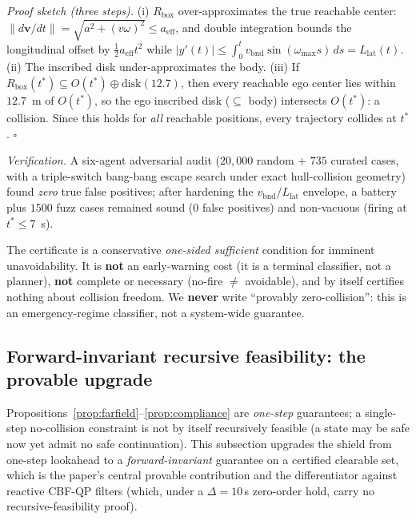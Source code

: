 \emph{Proof sketch (three steps).} (i) $R_{\mathrm{box}}$ over-approximates the true
reachable center: $\lVert d\bm{v}/dt\rVert=\sqrt{a^2+(v\omega)^2}\le a_{\mathrm{eff}}$,
and double integration bounds the longitudinal offset by $\tfrac12 a_{\mathrm{eff}}t^2$
while $|y'(t)|\le\int_0^t v_{\mathrm{bnd}}\sin(\omega_{\max}s)\,ds=L_{\mathrm{lat}}(t)$.
(ii) The inscribed disk under-approximates the body. (iii) If
$R_{\mathrm{box}}(t^\ast)\subseteq O(t^\ast)\oplus\mathrm{disk}(12.7)$, then every
reachable ego center lies within $12.7$~m of $O(t^\ast)$, so the ego inscribed disk
($\subseteq$ body) intersects $O(t^\ast)$: a collision. Since this holds for
\emph{all} reachable positions, every trajectory collides at $t^\ast$. $\square$

\emph{Verification.} A six-agent adversarial audit ($20{,}000$ random $+$ $735$
curated cases, with a triple-switch bang-bang escape search under exact hull-collision
geometry) found \emph{zero} true false positives; after hardening the
$v_{\mathrm{bnd}}/L_{\mathrm{lat}}$ envelope, a battery plus $1500$ fuzz cases
remained sound (0 false positives) and non-vacuous (firing at $t^\ast\le7$~s).

\begin{scope}
The certificate is a conservative \emph{one-sided sufficient} condition for
imminent unavoidability. It is \textbf{not} an early-warning cost (it is a terminal
classifier, not a planner), \textbf{not} complete or necessary (no-fire $\ne$
avoidable), and by itself certifies nothing about collision freedom. We
\textbf{never} write ``provably zero-collision'': this is an emergency-regime
classifier, not a system-wide guarantee.
\end{scope}

\subsection{Forward-invariant recursive feasibility: the provable upgrade}
\label{sec:provable-forward-invariant}

Propositions~\ref{prop:farfield}--\ref{prop:compliance} are \emph{one-step}
guarantees; a single-step no-collision constraint is not by itself recursively
feasible (a state may be safe now yet admit no safe continuation). This subsection
upgrades the shield from one-step lookahead to a \emph{forward-invariant} guarantee
on a certified clearable set, which is the paper's central provable contribution and
the differentiator against reactive CBF-QP filters (which, under a $\Delta=10$\,s
zero-order hold, carry no recursive-feasibility proof).

